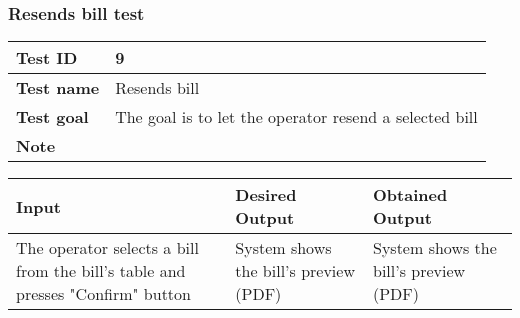 {{		\subsubsection{Resends bill test}{
			\begin{table}[h]
			\begin{tabular}{|p{4cm}|p{10cm}|}
			\hline
				\centering \vspace{1mm} \bfseries{Test ID} \vspace{1mm} & 
				\vspace{1mm} 9 \vspace{1mm}\\
			\hline
				\centering \vspace{1mm} \bfseries{Test name} \vspace{1mm} & 
				\vspace{1mm} Resends bill \vspace{1mm}\\
			\hline
				\centering \vspace{1mm} \bfseries{Test goal} \vspace{1mm} & 
				\vspace{1mm} The goal is to let the operator resend a selected bill\vspace{1mm}\\
			\hline
				\centering \vspace{1mm} \bfseries{Note} \vspace{1mm} & 
				\vspace{1mm}  \vspace{1mm}\\
			\hline
			\end{tabular}
			\end{table}

			\begin{table}[h]
			\begin{tabular}{|p{4cm}|p{5cm}|p{5cm}|}
			\hline
			\centering \vspace{1mm} \bfseries{Input} \vspace{1mm} & \vspace{1mm} \bfseries{Desired Output} \vspace{1mm} & \vspace{1mm} \bfseries{Obtained Output} \vspace{1mm}\\
			\hline
				\vspace{1mm} The operator selects a bill from the bill's table and presses "Confirm" button \vspace{1mm} &
				\vspace{1mm} System shows the bill's preview (PDF) \vspace{1mm} & 
				\vspace{1mm} System shows the bill's preview (PDF) \vspace{1mm} \\
			\hline
			\end{tabular}
			\end{table}
		}
		\clearpage

}}

